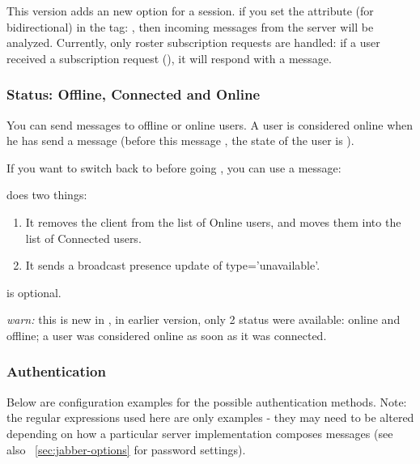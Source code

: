 \documentclass{TSUNG-en}
\begin{document}
\label{bidi:presence}
 This version adds an new option for a
session. if you set the attribute  (for bidirectional)
in the  tag: ,
then incoming messages from the server will be analyzed. Currently,
only roster subscription requests are handled: if a user received a
subscription request (), it
will respond with a 
message.

\subsubsection{Status: Offline, Connected and Online}

You can send messages to offline or online users. A user is considered
online when he has send a  message (before
this message , the state of the user is ).

If you want to switch back to  before going
, you can use a  message:

 does two things:
\begin{enumerate}
\item It removes the client from the list of Online users, and moves
  them into the list of Connected users.
\item  It sends a broadcast presence update of type='unavailable'.
\end{enumerate}

 is optional.

\emph{warn:} this is new in , in earlier version, only 2
status were available: online and offline; a user was considered
online as soon as it was connected.

\subsubsection{Authentication}

Below are configuration examples for the possible authentication
methods.  Note: the regular expressions used here are only examples -
they may need to be altered depending on how a particular server
implementation composes messages (see also ~\ref{sec:jabber-options}
for password settings).
\end{document}
